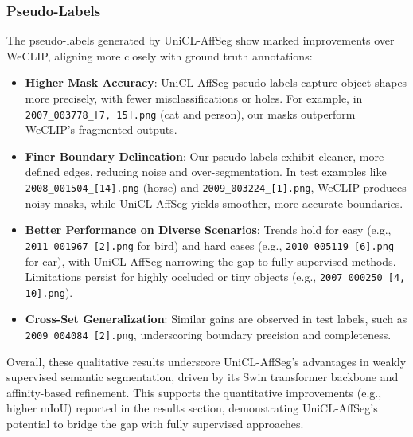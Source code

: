 \subsubsection{Pseudo-Labels}
The pseudo-labels generated by UniCL-AffSeg show marked improvements over WeCLIP, aligning more closely with ground truth annotations:
\begin{itemize}
    \item \textbf{Higher Mask Accuracy}: UniCL-AffSeg pseudo-labels capture object shapes more precisely, with fewer misclassifications or holes. For example, in \texttt{2007\_003778\_[7, 15].png} (cat and person), our masks outperform WeCLIP's fragmented outputs.
    \item \textbf{Finer Boundary Delineation}: Our pseudo-labels exhibit cleaner, more defined edges, reducing noise and over-segmentation. In test examples like \texttt{2008\_001504\_[14].png} (horse) and \texttt{2009\_003224\_[1].png}, WeCLIP produces noisy masks, while UniCL-AffSeg yields smoother, more accurate boundaries.
    \item \textbf{Better Performance on Diverse Scenarios}: Trends hold for easy (e.g., \texttt{2011\_001967\_[2].png} for bird) and hard cases (e.g., \texttt{2010\_005119\_[6].png} for car), with UniCL-AffSeg narrowing the gap to fully supervised methods. Limitations persist for highly occluded or tiny objects (e.g., \texttt{2007\_000250\_[4, 10].png}).
    \item \textbf{Cross-Set Generalization}: Similar gains are observed in test labels, such as \texttt{2009\_004084\_[2].png}, underscoring boundary precision and completeness.
\end{itemize}

Overall, these qualitative results underscore UniCL-AffSeg's advantages in weakly supervised semantic segmentation, driven by its Swin transformer backbone and affinity-based refinement. This supports the quantitative improvements (e.g., higher mIoU) reported in the results section, demonstrating UniCL-AffSeg's potential to bridge the gap with fully supervised approaches.



